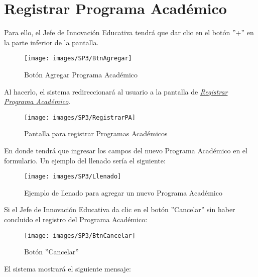         \section{Registrar Programa Académico}

            Para ello, el Jefe de Innovación Educativa tendrá que dar clic en el botón ''+'' en la parte inferior de la pantalla.

            \begin{figure}[!hbtp]
                \centering
                \hypertarget{add}{\texttt{[image: images/SP3/BtnAgregar]}}
                \caption{Botón Agregar Programa Académico}
                \label{add}
            \end{figure}

            Al hacerlo, el sistema redireccionará al usuario a la pantalla de \hyperlink{registrarpa}{\textit{Registrar Programa Académico}}.

        \begin{figure}[!hbtp]
            \centering
            \hypertarget{registrarpa}{\texttt{[image: images/SP3/RegistrarPA]}}
            \caption{Pantalla para registrar Programas Académicos}
            \label{registrarpa}
        \end{figure}

        En donde tendrá que ingresar los campos del nuevo Programa Académico en el formulario. Un ejemplo del llenado sería el siguiente:

        \begin{figure}[!hbtp]
            \centering
            \hypertarget{ejreg}{\texttt{[image: images/SP3/Llenado]}}
            \caption{Ejemplo de llenado para agregar un nuevo Programa Académico}
            \label{ejreg}
        \end{figure}

        Si el Jefe de Innovación Educativa da clic en el botón ''Cancelar'' sin haber concluido el registro del Programa Académico:

        \begin{figure}[!hbtp]
            \centering
            \hypertarget{cancel1}{\texttt{[image: images/SP3/BtnCancelar]}}
            \caption{Botón ''Cancelar''}
            \label{cancel1}
        \end{figure}

        El sistema mostrará el siguiente mensaje:

